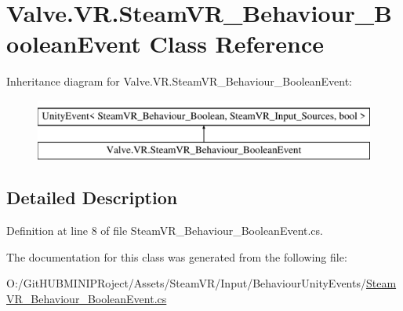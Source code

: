 \hypertarget{class_valve_1_1_v_r_1_1_steam_v_r___behaviour___boolean_event}{}\section{Valve.\+V\+R.\+Steam\+V\+R\+\_\+\+Behaviour\+\_\+\+Boolean\+Event Class Reference}
\label{class_valve_1_1_v_r_1_1_steam_v_r___behaviour___boolean_event}
Inheritance diagram for Valve.\+V\+R.\+Steam\+V\+R\+\_\+\+Behaviour\+\_\+\+Boolean\+Event\+:\begin{figure}[H]
\begin{center}
\leavevmode
\includegraphics[height=2.000000cm]{class_valve_1_1_v_r_1_1_steam_v_r___behaviour___boolean_event}
\end{center}
\end{figure}


\subsection{Detailed Description}


Definition at line 8 of file Steam\+V\+R\+\_\+\+Behaviour\+\_\+\+Boolean\+Event.\+cs.



The documentation for this class was generated from the following file\+:\begin{DoxyCompactItemize}
\item 
O\+:/\+Git\+H\+U\+B\+M\+I\+N\+I\+P\+Roject/\+Assets/\+Steam\+V\+R/\+Input/\+Behaviour\+Unity\+Events/\mbox{\hyperlink{_steam_v_r___behaviour___boolean_event_8cs}{Steam\+V\+R\+\_\+\+Behaviour\+\_\+\+Boolean\+Event.\+cs}}\end{DoxyCompactItemize}
